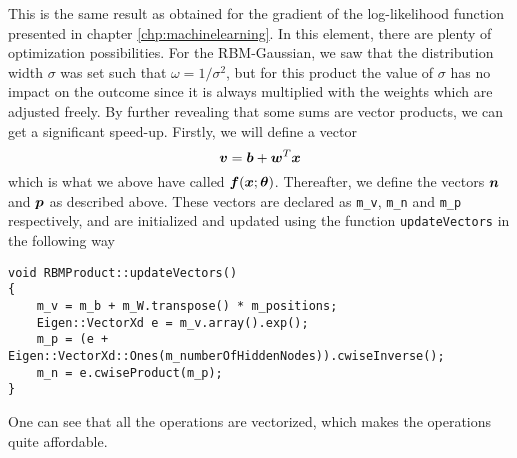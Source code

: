This is the same result as obtained for the gradient of the log-likelihood function presented in chapter \ref{chp:machinelearning}. In this element, there are plenty of optimization possibilities. For the RBM-Gaussian, we saw that the distribution width $\sigma$ was set such that $\omega=1/\sigma^2$, but for this product the value of $\sigma$ has no impact on the outcome since it is always multiplied with the weights which are adjusted freely. By further revealing that some sums are vector products, we can get a significant speed-up. Firstly, we will define a vector 
\begin{equation}
\boldsymbol{{v}}=\boldsymbol{{b}}+\boldsymbol{{w}}^T\boldsymbol{{x}}
\end{equation}
which is what we above have called $\boldsymbol{{f}}(\boldsymbol{{x}};\boldsymbol{{\theta}})$. Thereafter, we define the vectors $\boldsymbol{{n}}$ and $\boldsymbol{{p}}$ as described above. These vectors are declared as \lstinline|m_v|, \lstinline|m_n| and \lstinline|m_p| respectively, and are initialized and updated using the function \lstinline|updateVectors| in the following way

\begin{lstlisting}
void RBMProduct::updateVectors()
{
    m_v = m_b + m_W.transpose() * m_positions;
    Eigen::VectorXd e = m_v.array().exp();
    m_p = (e + Eigen::VectorXd::Ones(m_numberOfHiddenNodes)).cwiseInverse();
    m_n = e.cwiseProduct(m_p);
}
\end{lstlisting}
One can see that all the operations are vectorized, which makes the operations quite affordable. 


